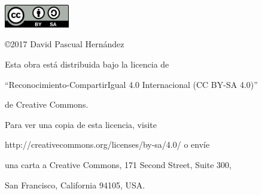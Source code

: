 \pagebreak
\thispagestyle{empty}
\vspace*{12cm}

\begin{flushright}
	
	\includegraphics[height=1.0cm]{figures/CC-BY-SA.png}
	
	\vspace*{0.5cm}
	
	\copyright 2017 David Pascual Hernández
	
	\vspace*{0.3cm}
	
	Esta obra está distribuida bajo la licencia de 
	
	``Reconocimiento-CompartirIgual 4.0 Internacional (CC BY-SA 4.0)''
	
	de Creative Commons.
	
	\vspace{0.2cm}
	
	Para ver una copia de esta licencia, visite
	
	http://creativecommons.org/licenses/by-sa/4.0/ o envíe
	
	una carta a Creative Commons, 171 Second Street, Suite 300,
	
	San Francisco, California 94105, USA.
	
\end{flushright}